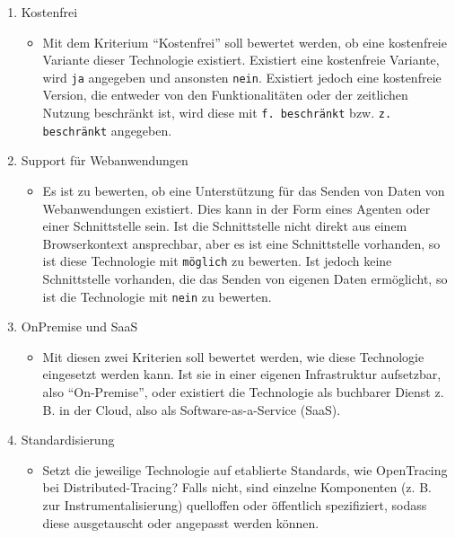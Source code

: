 \begin{enumerate}
	\item Kostenfrei
	\begin{itemize}
		\item Mit dem Kriterium \enquote{Kostenfrei} soll bewertet werden, ob eine kostenfreie Variante dieser Technologie existiert. Existiert eine kostenfreie Variante, wird \texttt{ja} angegeben und ansonsten \texttt{nein}. Existiert jedoch eine kostenfreie Version, die entweder von den Funktionalitäten oder der zeitlichen Nutzung beschränkt ist, wird diese mit \texttt{f. beschränkt} bzw. \texttt{z. beschränkt} angegeben.
	\end{itemize}

	\item Support für Webanwendungen
	\begin{itemize}
		\item Es ist zu bewerten, ob eine Unterstützung für das Senden von Daten von Webanwendungen existiert. Dies kann in der Form eines Agenten\footnotemark{} oder einer Schnittstelle sein. Ist die Schnittstelle nicht direkt aus einem Browserkontext ansprechbar, aber es ist eine Schnittstelle vorhanden, so ist diese Technologie mit \texttt{möglich} zu bewerten. Ist jedoch keine Schnittstelle vorhanden, die das Senden von eigenen Daten ermöglicht, so ist die Technologie mit \texttt{nein} zu bewerten.
	\end{itemize}

	\item OnPremise und SaaS
	\begin{itemize}
		\item Mit diesen zwei Kriterien soll bewertet werden, wie diese Technologie eingesetzt werden kann. Ist sie in einer eigenen Infrastruktur aufsetzbar, also \enquote{On-Premise}, oder existiert die Technologie als buchbarer Dienst z. B. in der Cloud, also als Software-as-a-Service (SaaS).
	\end{itemize}
	
	\pagebreak

	\item Standardisierung
	\begin{itemize}
		\item Setzt die jeweilige Technologie auf etablierte Standards, wie OpenTracing bei Distributed-Tracing? Falls nicht, sind einzelne Komponenten (z. B. zur Instrumentalisierung) quelloffen oder öffentlich spezifiziert, sodass diese ausgetauscht oder angepasst werden können.
	\end{itemize}


\end{enumerate}
